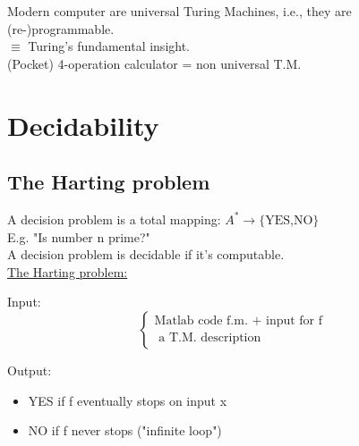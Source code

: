 Modern computer are universal Turing Machines, i.e., they are (re-)programmable.\\
$\equiv$ Turing's fundamental insight.\\
(Pocket) 4-operation calculator = non universal T.M.

\section{Decidability}

\subsection{The Harting problem}
A decision problem is a total mapping: $A^*\rightarrow \{\text{YES,NO}\}$\\
E.g. "Is number n prime?"\\
A decision problem is decidable if it's computable.\\

\underline{The Harting problem:}\\
\begin{leftbar}
Input:\begin{equation}
  \left\{
    \begin{split}
    \text{Matlab code f.m. + input for f}\\ 
    \text{ a T.M. description}
    \end{split}
  \right.
\end{equation}

Output:
\begin{itemize}
\item YES if f eventually stops on input x
\item NO if f never stops ("infinite loop")
\end{itemize}
\end{leftbar}